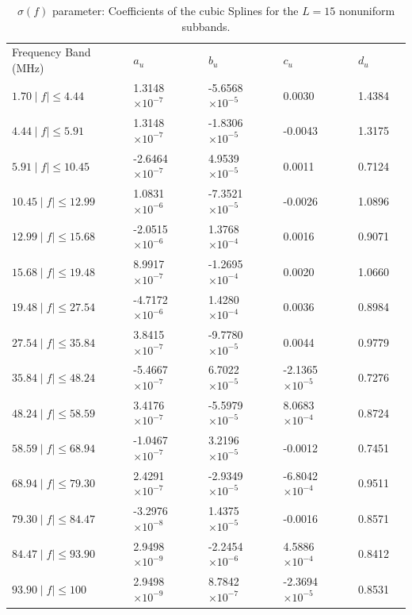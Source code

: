 \documentclass[journal]{IEEEtran}
\begin{document}
\begin{table}[h]
	\setlength\extrarowheight{4.5pt}
	\centering
	\vspace*{-5mm}
	\caption{$\sigma(f)$ parameter: Coefficients of the cubic Splines for the $L=15$ nonuniform subbands.}
	\label{table_betalW}
	\begin{tabular}{|C{3.5cm}|C{2.5cm}|C{2.5cm}|C{2.5cm}|C{2.5cm}|m{0cm}}
		Frequency Band (MHz)           		   & $a_u$    			   	   & $b_u$      			  & $c_u$   		 		 & $d_u$ &\\ 
		$1.70 \mid f\mid \leq 4.44$   & 1.3148  $\times 10^{-7}$  & -5.6568 $\times 10^{-5}$ & 0.0030	 				 & 1.4384 &\\ 
		$4.44 \mid f\mid \leq 5.91$   & 1.3148  $\times 10^{-7}$  & -1.8306 $\times 10^{-5}$ & -0.0043  				 & 1.3175 &\\ 
		$5.91 \mid f\mid \leq 10.45$  & -2.6464 $\times 10^{-7}$  & 4.9539 $\times 10^{-5}$  & 0.0011					 & 0.7124 &\\ 
		$10.45 \mid f\mid \leq 12.99$ & 1.0831  $\times 10^{-6}$  & -7.3521 $\times 10^{-5}$ & -0.0026	 				 & 1.0896 &\\ 
		$12.99 \mid f\mid \leq 15.68$ & -2.0515 $\times 10^{-6}$  & 1.3768  $\times 10^{-4}$ & 0.0016  				 & 0.9071 &\\ 
		$15.68 \mid f\mid \leq 19.48$ & 8.9917 $\times 10^{-7}$   & -1.2695 $\times 10^{-4}$ & 0.0020	 				 & 1.0660 &\\ 
		$19.48 \mid f\mid \leq 27.54$ & -4.7172 $\times 10^{-6}$  & 1.4280 $\times 10^{-4}$  & 0.0036 					 & 0.8984 &\\ 
		$27.54 \mid f\mid \leq 35.84$ & 3.8415  $\times 10^{-7}$  & -9.7780 $\times 10^{-5}$ & 0.0044 					 & 0.9779 &\\ 
		$35.84 \mid f\mid \leq 48.24$ & -5.4667 $\times 10^{-7}$  & 6.7022 $\times 10^{-5}$  & -2.1365	$\times 10^{-5}$ & 0.7276 &\\ 
		$48.24 \mid f\mid \leq 58.59$ & 3.4176  $\times 10^{-7}$  & -5.5979 $\times 10^{-5}$ & 8.0683	$\times 10^{-4}$ & 0.8724 &\\ 
		$58.59 \mid f\mid \leq 68.94$ & -1.0467 $\times 10^{-7}$  & 3.2196 $\times 10^{-5}$  & -0.0012  				 & 0.7451 &\\ 
		$68.94 \mid f\mid \leq 79.30$ & 2.4291  $\times 10^{-7}$  & -2.9349 $\times 10^{-5}$ & -6.8042	$\times 10^{-4}$ & 0.9511 &\\ 
		$79.30 \mid f\mid \leq 84.47$ & -3.2976 $\times 10^{-8}$  & 1.4375 $\times 10^{-5}$  & -0.0016  				 & 0.8571 &\\ 
		$84.47 \mid f\mid \leq 93.90$ & 2.9498  $\times 10^{-9}$  & -2.2454 $\times 10^{-6}$ & 4.5886	$\times 10^{-4}$ & 0.8412 &\\ 
		$93.90 \mid f\mid \leq 100$   & 2.9498  $\times 10^{-9}$  & 8.7842 $\times 10^{-7}$  & -2.3694 $\times 10^{-5}$ & 0.8531 &\\ 
	\end{tabular}
\end{table}
\end{document}
